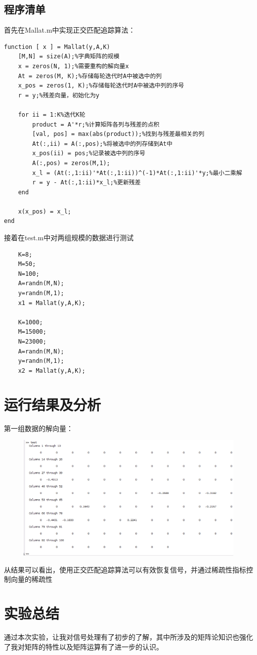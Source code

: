 \documentclass{article}
\begin{document}
\subsection{程序清单}
首先在Mallat.m中实现正交匹配追踪算法：
\begin{lstlisting}
function [ x ] = Mallat(y,A,K)
	[M,N] = size(A);%字典矩阵的规模
	x = zeros(N, 1);%需要重构的解向量x
	At = zeros(M, K);%存储每轮迭代时A中被选中的列
	x_pos = zeros(1, K);%存储每轮迭代时A中被选中列的序号
	r = y;%残差向量，初始化为y
	
	for ii = 1:K%迭代K轮
		product = A'*r;%计算矩阵各列与残差的点积
		[val, pos] = max(abs(product));%找到与残差最相关的列
		At(:,ii) = A(:,pos);%将被选中的列存储到At中
		x_pos(ii) = pos;%记录被选中列的序号
		A(:,pos) = zeros(M,1);
		x_l = (At(:,1:ii)'*At(:,1:ii))^(-1)*At(:,1:ii)'*y;%最小二乘解
		r = y - At(:,1:ii)*x_l;%更新残差
	end
	
	x(x_pos) = x_l;
end
\end{lstlisting}
接着在test.m中对两组规模的数据进行测试
\begin{lstlisting}
	K=8;
	M=50;
	N=100;
	A=randn(M,N);
	y=randn(M,1);
	x1 = Mallat(y,A,K);
	
	K=1000;
	M=15000;
	N=23000;
	A=randn(M,N);
	y=randn(M,1);
	x2 = Mallat(y,A,K);
\end{lstlisting}

\section{运行结果及分析}
第一组数据的解向量：
\begin{figure}[h]
	\centering
	\includegraphics[scale=0.6]{output.png}
\end{figure}

从结果可以看出，使用正交匹配追踪算法可以有效恢复信号，并通过稀疏性指标控制向量的稀疏性
\section{实验总结}
通过本次实验，让我对信号处理有了初步的了解，其中所涉及的矩阵论知识也强化了我对矩阵的特性以及矩阵运算有了进一步的认识。
\end{document}
